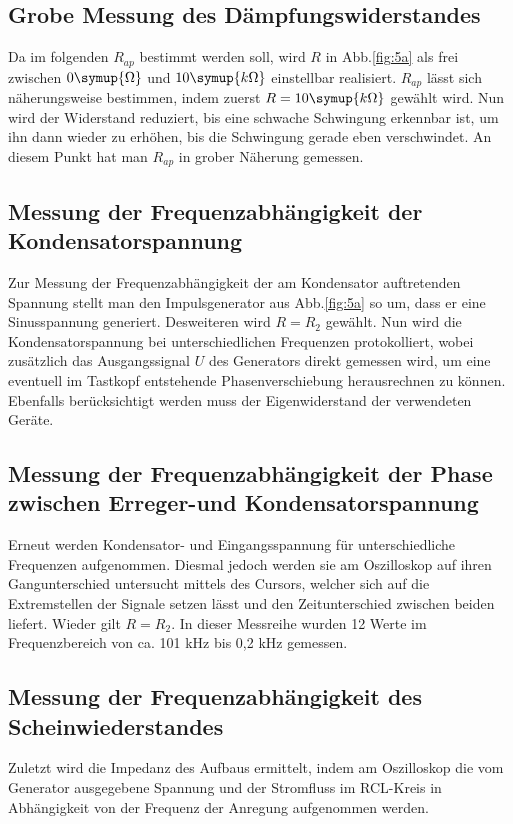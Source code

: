 \subsection{Grobe Messung des Dämpfungswiderstandes}
Da im folgenden $R_{ap}$ bestimmt werden soll, wird $R$ in Abb.\ref{fig:5a} als
frei zwischen $0\symup{\Omega}$ und $10\symup{k\Omega}$ einstellbar realisiert.
$R_{ap}$ lässt
sich näherungsweise bestimmen, indem zuerst $R = 10\symup{k\Omega}$ gewählt wird. Nun
wird der Widerstand reduziert, bis eine schwache Schwingung
erkennbar ist, um ihn dann wieder zu erhöhen, bis die Schwingung
gerade eben verschwindet. An diesem Punkt hat man $R_{ap}$ in grober Näherung
gemessen.

\subsection{Messung der Frequenzabhängigkeit der Kondensatorspannung}
Zur Messung der Frequenzabhängigkeit der am Kondensator auftretenden Spannung
stellt man den Impulsgenerator aus Abb.\ref{fig:5a} so um, dass er eine
Sinusspannung generiert. Desweiteren wird $R=R_2$ gewählt. Nun wird die
Kondensatorspannung bei unterschiedlichen Frequenzen protokolliert, wobei
zusätzlich das Ausgangssignal $U$ des Generators direkt gemessen wird, um eine
eventuell im Tastkopf entstehende Phasenverschiebung herausrechnen zu können.
Ebenfalls berücksichtigt werden muss der Eigenwiderstand der verwendeten Geräte.

\subsection{Messung der Frequenzabhängigkeit der Phase zwischen Erreger-und Kondensatorspannung}
Erneut werden Kondensator- und Eingangsspannung für unterschiedliche Frequenzen
aufgenommen. Diesmal jedoch werden sie am Oszilloskop auf ihren Gangunterschied
untersucht mittels des Cursors, welcher sich auf die Extremstellen der Signale
setzen lässt und den Zeitunterschied zwischen beiden liefert. Wieder gilt $R=R_2$.
In dieser Messreihe wurden 12 Werte im Frequenzbereich von ca. 101 kHz bis 0,2 kHz
gemessen.


\subsection{Messung der Frequenzabhängigkeit des Scheinwiederstandes}
Zuletzt wird die Impedanz des Aufbaus ermittelt, indem am Oszilloskop die vom
Generator ausgegebene Spannung und der Stromfluss im RCL-Kreis in Abhängigkeit
von der Frequenz der Anregung aufgenommen werden.
